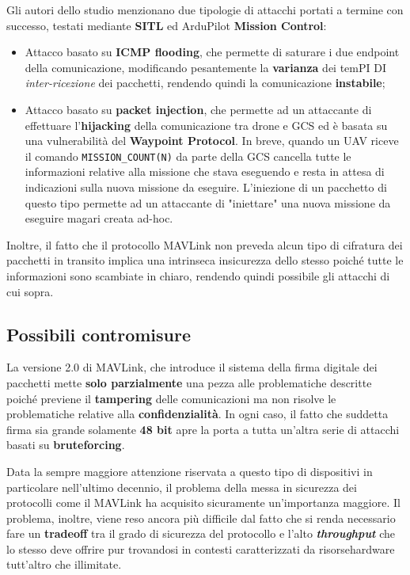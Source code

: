\documentclass[a4paper, 12pt, oneside]{article}
\theoremstyle{definition}
\begin{document}
Gli autori dello studio menzionano due tipologie di attacchi portati a termine con successo, testati mediante \textbf{SITL} ed ArduPilot \textbf{Mission Control}:

\begin{itemize}
    \item Attacco basato su \textbf{ICMP flooding}, che permette di saturare i due endpoint della comunicazione, modificando pesantemente la \textbf{varianza} dei temPI DI \textit{inter-ricezione} dei pacchetti, rendendo quindi la comunicazione \textbf{instabile};
    \item Attacco basato su \textbf{packet injection}, che permette ad un attaccante di effettuare l'\textbf{hijacking} della comunicazione tra drone e GCS ed è basata su una vulnerabilità del \textbf{Waypoint Protocol}. In breve, quando un UAV riceve il comando \texttt{MISSION\_COUNT(N)} da parte della GCS cancella tutte le informazioni relative alla missione che stava eseguendo e resta in attesa di indicazioni sulla nuova missione da eseguire. L'iniezione di un pacchetto di questo tipo permette ad un attaccante di "iniettare" una nuova missione da eseguire magari creata ad-hoc.
\end{itemize}

Inoltre, il fatto che il protocollo MAVLink non preveda alcun tipo di cifratura dei pacchetti in transito \cite{mavlink-no-encrypt} implica una intrinseca insicurezza dello stesso poiché tutte le informazioni sono scambiate in chiaro, rendendo quindi possibile gli attacchi di cui sopra.

\subsection{Possibili contromisure}
La versione 2.0 di MAVLink, che introduce il sistema della firma digitale dei pacchetti mette \textbf{solo parzialmente} una pezza alle problematiche descritte poiché previene il \textbf{tampering} delle comunicazioni ma non risolve le problematiche relative alla \textbf{confidenzialità}. In ogni caso, il fatto che suddetta firma sia grande solamente \textbf{48 bit} apre la porta a tutta un'altra serie di attacchi basati su \textbf{bruteforcing}.

Data la sempre maggiore attenzione riservata a questo tipo di dispositivi in particolare nell'ultimo decennio, il problema della messa in sicurezza dei protocolli come il MAVLink ha acquisito sicuramente un'importanza maggiore. Il problema, inoltre, viene reso ancora più difficile dal fatto che si renda necessario fare un \textbf{tradeoff} tra il grado di sicurezza del protocollo e l'alto \textbf{\textit{throughput}} che lo stesso deve offrire pur trovandosi in contesti caratterizzati da risorsehardware tutt'altro che illimitate.
\end{document}
